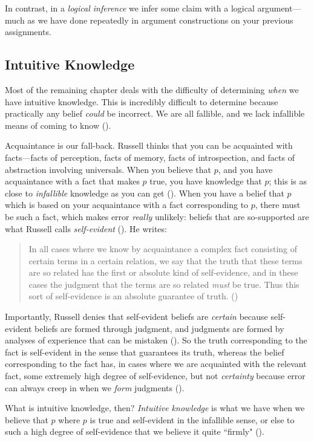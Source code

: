 \documentclass[oneside,letterpaper,12pt]{book}
\begin{document}
In contrast, in a \textit{logical inference} we infer some claim with a logical argument---much as we have done repeatedly in argument constructions on your previous assignments.
\subsection*{Intuitive Knowledge}
Most of the remaining chapter deals with the difficulty of determining \textit{when} we have intuitive knowledge. This is incredibly difficult to determine because practically any belief \textit{could} be incorrect. We are all fallible, and we lack infallible means of coming to know (\pageref{fallible}).

Acquaintance is our fall-back. Russell thinks that you can be acquainted with facts---facts of perception, facts of memory, facts of introspection, and facts of abstraction involving universals. When you believe that $p$, and you have acquaintance with a fact that makes $p$ true, you have knowledge that $p$; this is as close to \textit{infallible} knowledge as you can get (\pageref{infallible}). When you have a belief that $p$ which is based on your acquaintance with a fact corresponding to $p$, there must be such a fact, which makes error \textit{really} unlikely: beliefs that are so-supported are what Russell calls \textit{self-evident} (\pageref{selfevidence}). He writes:
\begin{quote}
	In all cases where we know by acquaintance a complex fact consisting of certain terms in a certain relation, we say that the truth that these terms are so related has the first or absolute kind of self-evidence, and in these cases the judgment that the terms are so related \textit{must} be true. Thus this sort of self-evidence is an absolute guarantee of truth. (\pageref{selfevidence})
\end{quote}
Importantly, Russell denies that self-evident beliefs are \textit{certain} because self-evident beliefs are formed through judgment, and judgments are formed by analyses of experience that can be mistaken (\pageref{fallible}). So the truth corresponding to the fact is self-evident in the sense that guarantees its truth, whereas the belief corresponding to the fact has, in cases where we are acquainted with the relevant fact, some extremely high degree of self-evidence, but not \textit{certainty} because error can always creep in when we \textit{form} judgments (\pageref{fallible}).

What is intuitive knowledge, then? \textit{Intuitive knowledge} is what we have when we believe that $p$ where $p$ is true and self-evident in the infallible sense, or else to such a high degree of self-evidence that we believe it quite ``firmly" (\pageref{firm}).
\end{document}
